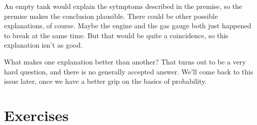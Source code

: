 \documentclass[justified]{tufte-book}
\theoremstyle{definition}
\theoremstyle{definition}
\theoremstyle{definition}
\theoremstyle{remark}
\begin{document}
An empty tank would explain the sytmptoms described in the premise, so
the premise makes the conclusion plausible. There could be other
possible explanations, of course. Maybe the engine and the gas gauge
both just happened to break at the same time. But that would be quite a
coincidence, so this explanation isn't as good.

What makes one explanation better than another? That turns out to be a
very hard question, and there is no generally accepted answer. We'll
come back to this issue later, once we have a better grip on the basics
of probability.

\hypertarget{exercises-1}{%
\section*{Exercises}\label{exercises-1}}
\end{document}
